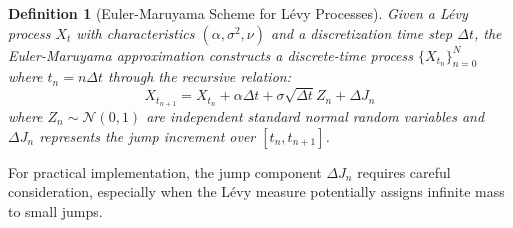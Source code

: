 \documentclass[a4paper,12pt]{report}
\newtheorem{definition}{Definition}
\begin{document}
\begin{definition}[Euler-Maruyama Scheme for Lévy Processes]
    Given a Lévy process $X_t$ with characteristics $(\alpha, \sigma^2, \nu)$ and a discretization time step $\Delta t$, the Euler-Maruyama approximation constructs a discrete-time process $\{X_{t_n}\}_{n=0}^N$ where $t_n = n\Delta t$ through the recursive relation:
    \begin{equation}
        X_{t_{n+1}} = X_{t_n} + \alpha \Delta t + \sigma\sqrt{\Delta t}Z_n + \Delta J_n
    \end{equation}
    where $Z_n \sim \mathcal{N}(0,1)$ are independent standard normal random variables and $\Delta J_n$ represents the jump increment over $[t_n, t_{n+1}]$.
\end{definition}
\iffalse
    For practical implementation, the jump component $\Delta J_n$ requires careful consideration, especially when the Lévy measure potentially assigns infinite mass to small jumps.
\end{document}

